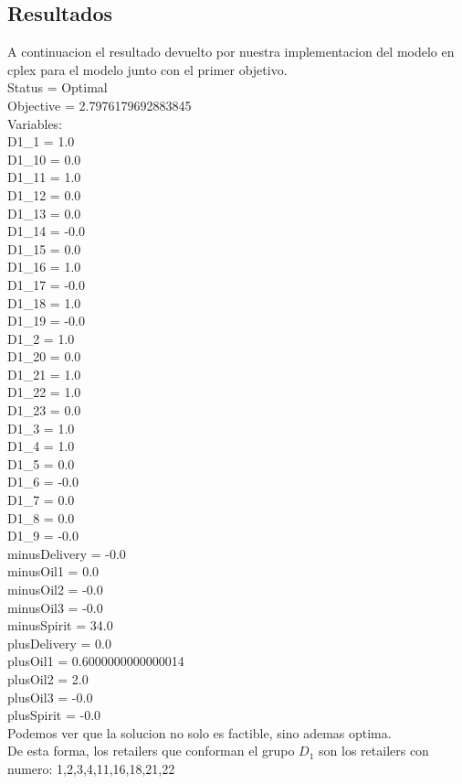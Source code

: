 \subsection{Resultados}

A continuacion el resultado devuelto por nuestra implementacion del modelo en cplex para el modelo junto con el primer objetivo.\\


Status = Optimal \\
Objective = 2.7976179692883845 \\
Variables: \\
D1\_1 = 1.0 \\
D1\_10 = 0.0 \\
D1\_11 = 1.0 \\
D1\_12 = 0.0 \\
D1\_13 = 0.0 \\
D1\_14 = -0.0 \\
D1\_15 = 0.0 \\
D1\_16 = 1.0 \\
D1\_17 = -0.0 \\
D1\_18 = 1.0 \\
D1\_19 = -0.0 \\
D1\_2 = 1.0 \\
D1\_20 = 0.0 \\
D1\_21 = 1.0 \\
D1\_22 = 1.0 \\
D1\_23 = 0.0 \\
D1\_3 = 1.0 \\
D1\_4 = 1.0 \\
D1\_5 = 0.0 \\
D1\_6 = -0.0 \\
D1\_7 = 0.0 \\
D1\_8 = 0.0 \\
D1\_9 = -0.0 \\
minusDelivery = -0.0 \\
minusOil1 = 0.0 \\
minusOil2 = -0.0 \\
minusOil3 = -0.0 \\
minusSpirit = 34.0 \\
plusDelivery = 0.0 \\
plusOil1 = 0.6000000000000014 \\
plusOil2 = 2.0 \\
plusOil3 = -0.0 \\
plusSpirit = -0.0 \\


Podemos ver que la solucion no solo es factible, sino ademas optima.\\
De esta forma, los retailers que conforman el grupo $D_{1}$ son los retailers con numero: 1,2,3,4,11,16,18,21,22\\

